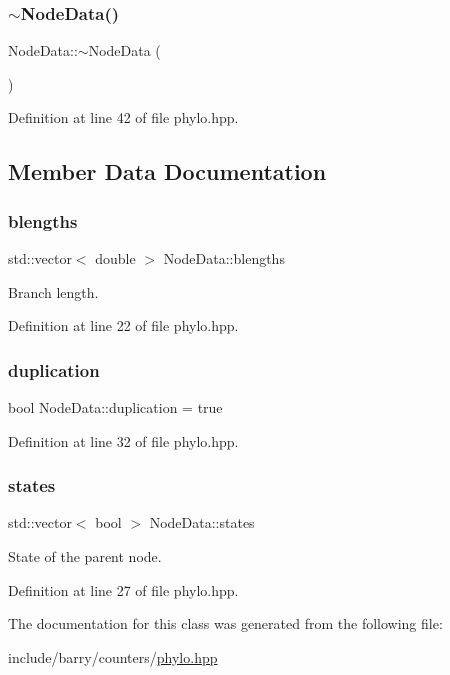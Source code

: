 \subsubsection{\texorpdfstring{$\sim$\+Node\+Data()}{~NodeData()}}
{\footnotesize\ttfamily Node\+Data\+::$\sim$\+Node\+Data (\begin{DoxyParamCaption}{ }\end{DoxyParamCaption})\hspace{0.3cm}{\ttfamily [inline]}}



Definition at line 42 of file phylo.\+hpp.



\subsection{Member Data Documentation}
\mbox{\label{class_node_data_a02da5f097c105813216d87ef89ad7bd4}} 
\subsubsection{\texorpdfstring{blengths}{blengths}}
{\footnotesize\ttfamily std\+::vector$<$ double $>$ Node\+Data\+::blengths}

Branch length. 

Definition at line 22 of file phylo.\+hpp.

\mbox{\label{class_node_data_a6c21d52091bb4fa6e3d431856da17caa}} 
\subsubsection{\texorpdfstring{duplication}{duplication}}
{\footnotesize\ttfamily bool Node\+Data\+::duplication = true}



Definition at line 32 of file phylo.\+hpp.

\mbox{\label{class_node_data_a33caaadde6afe892624501bdb0edaea6}} 
\subsubsection{\texorpdfstring{states}{states}}
{\footnotesize\ttfamily std\+::vector$<$ bool $>$ Node\+Data\+::states}

State of the parent node. 

Definition at line 27 of file phylo.\+hpp.



The documentation for this class was generated from the following file\+:\begin{DoxyCompactItemize}
\item 
include/barry/counters/\hyperlink{phylo_8hpp}{phylo.\+hpp}\end{DoxyCompactItemize}

